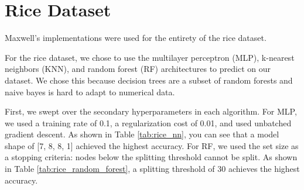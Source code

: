 \section{Rice Dataset}
Maxwell's implementations were used for the entirety of the rice dataset.

For the rice dataset, we chose to use the multilayer perceptron (MLP), k-nearest neighbors (KNN), and
random forest (RF) architectures to predict on our dataset.
We chose this because decision trees are a subset of random forests and naive bayes is hard to adapt
to numerical data.

First, we swept over the secondary hyperparameters in each algorithm.
For MLP, we used a training rate of 0.1, a regularization cost of 0.01, and used unbatched gradient
descent.
As shown in Table \ref{tab:rice_nn}, you can see that a model shape of [7, 8, 8, 1] achieved the
highest accuracy.
For RF, we used the set size as a stopping criteria: nodes below the splitting threshold cannot be
split.
As shown in Table \ref{tab:rice_random_forest}, a splitting threshold of 30 achieves the highest
accuracy.

